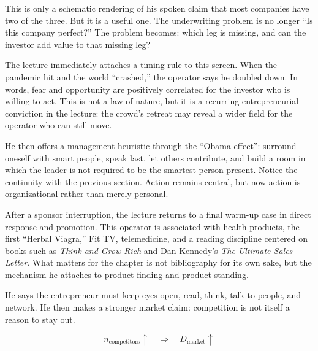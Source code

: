This is only a schematic rendering of his spoken claim that most companies have two of the three. But it is a useful one. The underwriting problem is no longer ``Is this company perfect?'' The problem becomes: which leg is missing, and can the investor add value to that missing leg?

\begin{figure}
\centering
{}
\end{figure}

The lecture immediately attaches a timing rule to this screen. When the pandemic hit and the world ``crashed,'' the operator says he doubled down. In words, fear and opportunity are positively correlated for the investor who is willing to act. This is not a law of nature, but it is a recurring entrepreneurial conviction in the lecture: the crowd's retreat may reveal a wider field for the operator who can still move.

He then offers a management heuristic through the ``Obama effect'': surround oneself with smart people, speak last, let others contribute, and build a room in which the leader is not required to be the smartest person present. Notice the continuity with the previous section. Action remains central, but now action is organizational rather than merely personal.

After a sponsor interruption, the lecture returns to a final warm-up case in direct response and promotion. This operator is associated with health products, the first ``Herbal Viagra,'' Fit TV, telemedicine, and a reading discipline centered on books such as \textit{Think and Grow Rich} and Dan Kennedy's \textit{The Ultimate Sales Letter}. What matters for the chapter is not bibliography for its own sake, but the mechanism he attaches to product finding and product standing.

He says the entrepreneur must keep eyes open, read, think, talk to people, and network. He then makes a stronger market claim: competition is not itself a reason to stay out.

\begin{equation}
n_{\mathrm{competitors}} \uparrow \quad \Rightarrow \quad D_{\mathrm{market}} \uparrow
\end{equation}

